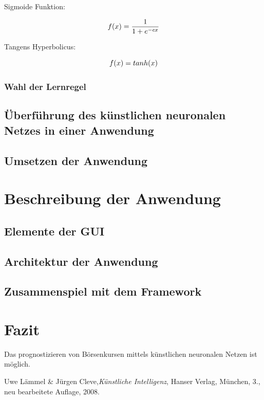 \documentclass[a4paper,DIV11,bibliography=totoc,headings=normal,ngerman,headsepline]{scrreprt}
\newcommand*{\formelentry}[1]{\addcontentsline{for}{formel}{\protect\numberline{Formel~\theequation} #1}}
\begin{document}
Sigmoide Funktion:

\begin{equation}\formelentry{Sigmoide Funktion}
f(x)= \frac{1}{1+e^{-cx}}
\end{equation}

Tangens Hyperbolicus:

\begin{equation}\formelentry{Tanh Funktion}
f(x)= tanh(x)
\end{equation}

\subsection{Wahl der Lernregel} %
\section{Überführung des künstlichen neuronalen Netzes in einer Anwendung}
\section{Umsetzen der Anwendung} %

\chapter{Beschreibung der Anwendung} %
\section{Elemente der GUI} %
\section{Architektur der Anwendung} %
\section{Zusammenspiel mit dem Framework} %

\chapter{Fazit} %
Das prognostizieren von Börsenkursen mittels künstlichen neuronalen Netzen ist möglich.

\begin{thebibliography}{999}

 Uwe Lämmel \& Jürgen Cleve,\emph{Künstliche Intelligenz}, Hanser Verlag, München, 3., neu bearbeitete Auflage, 2008.

\end{thebibliography}
\end{document}
